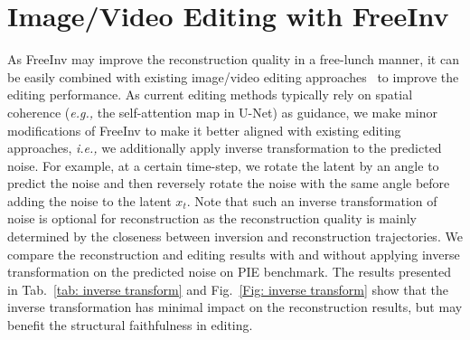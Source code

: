 \documentclass{article}
\begin{document}
\section{Image/Video Editing with FreeInv}
As FreeInv may improve the reconstruction quality in a free-lunch manner, it can be easily combined with existing image/video editing approaches~\cite{hertz2022prompt, pnpDiffusion2023, cao2023masactrl, geyer2023tokenflow} to improve the editing performance.
As current editing methods typically rely on spatial coherence (\emph{e.g.,} the self-attention map in U-Net) as guidance,
we make minor modifications of FreeInv to make it better aligned with existing editing approaches, \emph{i.e.,} we additionally apply inverse transformation to the predicted noise. For example, at a certain time-step, we rotate the latent by an angle to predict the noise and then reversely rotate the noise with the same angle before adding the noise to the latent $x_t$. Note that such an inverse transformation of noise is optional for reconstruction as the reconstruction quality is mainly determined by the closeness between inversion and reconstruction trajectories. 
We compare the reconstruction and editing results with and without applying inverse transformation on the predicted noise on PIE benchmark.
The results presented in Tab.~\ref{tab: inverse transform} and Fig.~\ref{Fig: inverse transform} show that the inverse transformation has minimal impact on the reconstruction results, but may benefit the structural faithfulness in editing.


\begin{table}[h]
\begin{center}
\caption{Ablation study on the effect of inverse transformation applied on the predicted noise with respect to reconstruction quality on the PIE benchmark.}
\label{tab: inverse transform}
\end{center}
\end{table}
\end{document}
